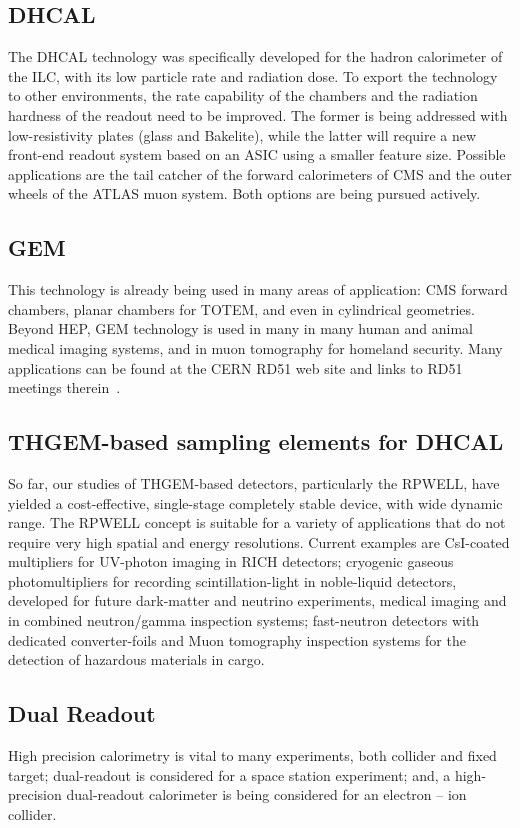 \subsection{DHCAL}
The DHCAL technology was specifically developed for the hadron calorimeter of the ILC, with its low particle rate and radiation dose. To export the technology to other environments, the rate capability of the chambers and the radiation hardness of the readout need to be improved. The former is being addressed with low-resistivity plates (glass and Bakelite), while the latter will require a new front-end readout system based on an ASIC using a smaller feature size. Possible applications are the tail catcher of the forward calorimeters of CMS and the outer wheels of the ATLAS muon system. Both options are being pursued actively.

\subsection{GEM}
This technology is already being used in many areas of application: CMS forward chambers, planar chambers for TOTEM, and even in cylindrical geometries. Beyond HEP, GEM technology is used in many in many human and animal medical imaging systems, and in muon tomography for homeland security. Many applications can be found at the CERN RD51 web site and links to RD51 meetings therein~\cite{RD51Collaboration}.

\subsection{THGEM-based sampling elements for DHCAL}
So far, our studies of THGEM-based detectors, particularly the RPWELL, have yielded a cost-effective, single-stage completely stable device, with wide dynamic range. The RPWELL concept is suitable for a variety of applications that do not require very high spatial and energy resolutions. Current examples are CsI-coated multipliers for UV-photon imaging in RICH detectors; cryogenic gaseous photomultipliers for recording scintillation-light in noble-liquid detectors, developed for future dark-matter and neutrino experiments, medical imaging and in combined neutron/gamma inspection systems; fast-neutron detectors with dedicated converter-foils and Muon tomography inspection systems for the detection of hazardous materials in cargo.

\subsection{Dual Readout}
High precision calorimetry is vital to many experiments, both collider and fixed target; dual-readout is considered for a space station experiment; and, a high-precision dual-readout calorimeter is being considered for an electron -- ion collider.

